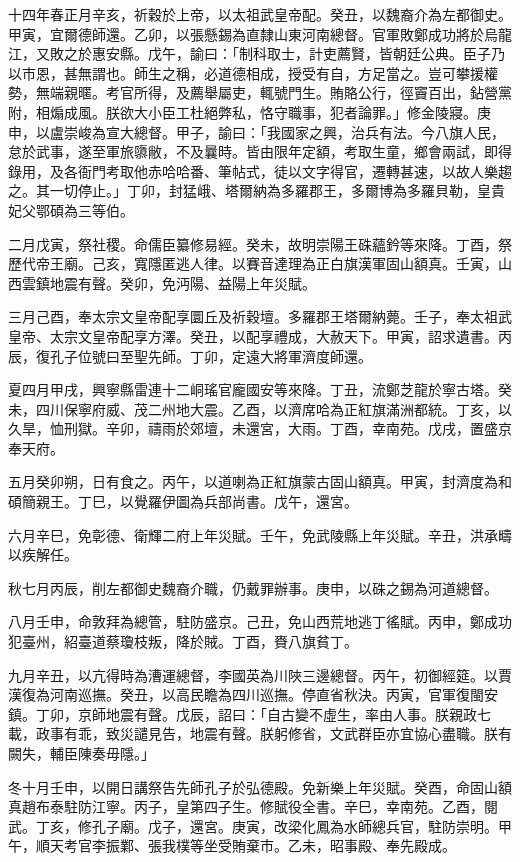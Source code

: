\begin{pinyinscope}
十四年春正月辛亥，祈穀於上帝，以太祖武皇帝配。癸丑，以魏裔介為左都御史。甲寅，宜爾德師還。乙卯，以張懸錫為直隸山東河南總督。官軍敗鄭成功將於烏龍江，又敗之於惠安縣。戊午，諭曰：「制科取士，計吏薦賢，皆朝廷公典。臣子乃以市恩，甚無謂也。師生之稱，必道德相成，授受有自，方足當之。豈可攀援權勢，無端親暱。考官所得，及薦舉屬吏，輒號門生。賄賂公行，徑竇百出，鉆營黨附，相煽成風。朕欲大小臣工杜絕弊私，恪守職事，犯者論罪。」修金陵寢。庚申，以盧崇峻為宣大總督。甲子，諭曰：「我國家之興，治兵有法。今八旗人民，怠於武事，遂至軍旅隳敝，不及曩時。皆由限年定額，考取生童，鄉會兩試，即得錄用，及各衙門考取他赤哈哈番、筆帖式，徒以文字得官，遷轉甚速，以故人樂趨之。其一切停止。」丁卯，封猛峨、塔爾納為多羅郡王，多爾博為多羅貝勒，皇貴妃父鄂碩為三等伯。

二月戊寅，祭社稷。命儒臣纂修易經。癸未，故明崇陽王硃蘊鈐等來降。丁酉，祭歷代帝王廟。己亥，寬隱匿逃人律。以賽音達理為正白旗漢軍固山額真。壬寅，山西雲鎮地震有聲。癸卯，免沔陽、益陽上年災賦。

三月己酉，奉太宗文皇帝配享圜丘及祈穀壇。多羅郡王塔爾納薨。壬子，奉太祖武皇帝、太宗文皇帝配享方澤。癸丑，以配享禮成，大赦天下。甲寅，詔求遺書。丙辰，復孔子位號曰至聖先師。丁卯，定遠大將軍濟度師還。

夏四月甲戌，興寧縣雷連十二峒瑤官龐國安等來降。丁丑，流鄭芝龍於寧古塔。癸未，四川保寧府威、茂二州地大震。乙酉，以濟席哈為正紅旗滿洲都統。丁亥，以久旱，恤刑獄。辛卯，禱雨於郊壇，未還宮，大雨。丁酉，幸南苑。戊戌，置盛京奉天府。

五月癸卯朔，日有食之。丙午，以道喇為正紅旗蒙古固山額真。甲寅，封濟度為和碩簡親王。丁巳，以覺羅伊圖為兵部尚書。戊午，還宮。

六月辛巳，免彰德、衛輝二府上年災賦。壬午，免武陵縣上年災賦。辛丑，洪承疇以疾解任。

秋七月丙辰，削左都御史魏裔介職，仍戴罪辦事。庚申，以硃之錫為河道總督。

八月壬申，命敦拜為總管，駐防盛京。己丑，免山西荒地逃丁徭賦。丙申，鄭成功犯臺州，紹臺道蔡瓊枝叛，降於賊。丁酉，賚八旗貧丁。

九月辛丑，以亢得時為漕運總督，李國英為川陜三邊總督。丙午，初御經筵。以賈漢復為河南巡撫。癸丑，以高民瞻為四川巡撫。停直省秋決。丙寅，官軍復閩安鎮。丁卯，京師地震有聲。戊辰，詔曰：「自古變不虛生，率由人事。朕親政七載，政事有乖，致災譴見告，地震有聲。朕躬修省，文武群臣亦宜協心盡職。朕有闕失，輔臣陳奏毋隱。」

冬十月壬申，以開日講祭告先師孔子於弘德殿。免新樂上年災賦。癸酉，命固山額真趙布泰駐防江寧。丙子，皇第四子生。修賦役全書。辛巳，幸南苑。乙酉，閱武。丁亥，修孔子廟。戊子，還宮。庚寅，改梁化鳳為水師總兵官，駐防崇明。甲午，順天考官李振鄴、張我樸等坐受賄棄市。乙未，昭事殿、奉先殿成。


\end{pinyinscope}
